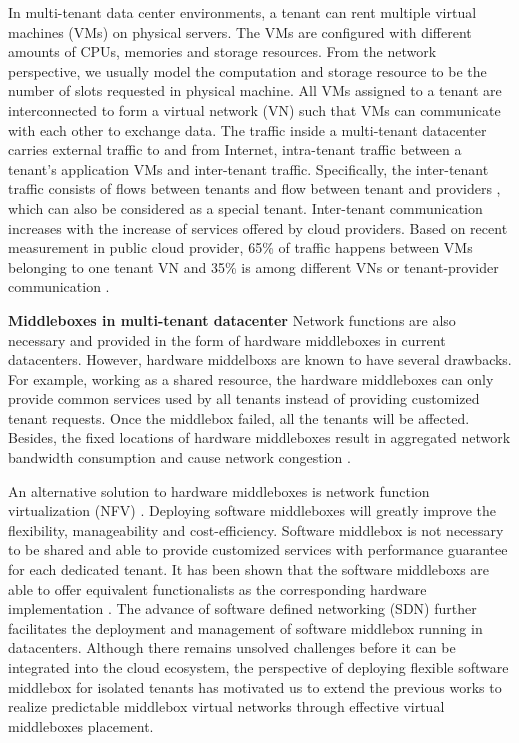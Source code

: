 \documentclass[10pt, conference, letterpaper]{IEEEtran}
\begin{document}
In multi-tenant data center environments, a tenant can rent multiple virtual machines (VMs) on physical servers. The VMs are configured with different amounts of CPUs, memories and storage resources. From the network perspective, we usually model the computation and storage resource to be the number of slots requested in physical machine. All VMs assigned to a tenant are interconnected to form a virtual network (VN) such that VMs can communicate with each other to exchange data. The traffic inside a multi-tenant datacenter carries external traffic to and from Internet, intra-tenant traffic between a tenant's application VMs and inter-tenant traffic. Specifically, the inter-tenant traffic consists of flows between tenants and flow between tenant and providers \cite{B13cta}, which can also be considered as a special tenant. Inter-tenant communication increases with the increase of services offered by cloud providers. Based on recent measurement in public cloud provider, 65\% of traffic happens between VMs belonging to one tenant VN and 35\% is among different VNs or tenant-provider communication \cite{B13cta, P13acs}.

\textbf{Middleboxes in multi-tenant datacenter }
Network functions are also necessary and provided in the form of hardware middleboxes in current datacenters.  However, hardware middelboxs are known to have several drawbacks. For example, working as a shared resource, the hardware middleboxes can only provide common services used by all tenants instead of providing customized tenant requests. Once the middlebox failed, all the tenants will be affected. Besides, the fixed locations of hardware middleboxes result in aggregated network bandwidth consumption and cause network congestion \cite{ClickOS, Y15NFV}. 

An alternative solution to hardware middleboxes is network function virtualization (NFV) \cite{NFV}. Deploying software middleboxes will greatly improve the flexibility, manageability and cost-efficiency. Software middlebox is not necessary to be shared and able to provide customized services with performance guarantee for each dedicated tenant. It has been shown that the software middleboxs are able to offer equivalent functionalists as the corresponding hardware implementation \cite{D12tpp, S12dai, G13dio, ClickOS}. The advance of software defined networking (SDN) further facilitates the deployment and management of software middlebox running in datacenters. Although there remains unsolved challenges before it can be integrated into the cloud ecosystem, the perspective of deploying flexible software middlebox for isolated tenants has motivated us to extend the previous works to realize predictable middlebox virtual networks through effective virtual middleboxes placement.
\end{document}

